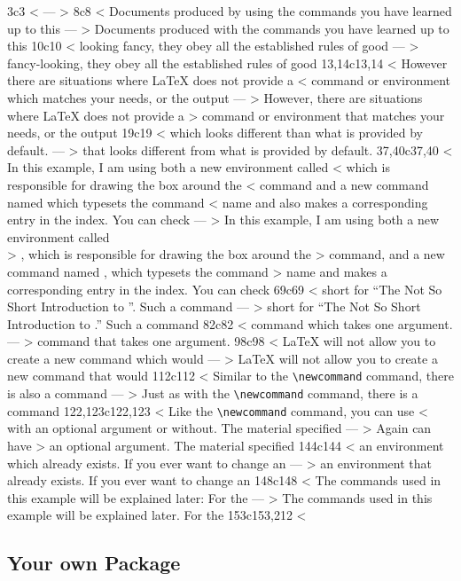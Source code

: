 3c3
< %
---
> %
8c8
< Documents produced by using the commands you have learned up to this
---
> Documents produced with the commands you have learned up to this
10c10
< looking fancy, they obey all the established rules of good
---
> fancy-looking, they obey all the established rules of good
13,14c13,14
< However there are situations where \LaTeX{} does not provide a
< command or environment which matches your needs, or the output
---
> However, there are situations where \LaTeX{} does not provide a
> command or environment that matches your needs, or the output
19c19
< which looks different than what is provided by default.
---
> that looks different from what is provided by default.
37,40c37,40
< In this example, I am using both a new environment called
<  which is responsible for drawing the box around the
< command and a new command named  which typesets the command
< name and also makes a corresponding entry in the index. You can check
---
> In this example, I am using both a new environment called\\
> , which is responsible for drawing the box around the
> command, and a new command named , which typesets the command
> name and makes a corresponding entry in the index. You can check
69c69
< short for ``The Not So Short Introduction to \LaTeXe''. Such a command
---
> short for ``The Not So Short Introduction to \LaTeXe.'' Such a command
82c82
< command which takes one argument.
---
> command that takes one argument.
98c98
< \LaTeX{} will not allow you to create a new command which would
---
> \LaTeX{} will not allow you to create a new command that would
112c112
< Similar to the \verb|\newcommand| command, there is also a command
---
> Just as with the \verb|\newcommand| command, there is a command
122,123c122,123
< Like the \verb|\newcommand| command, you can use 
< with an optional argument or without. The material specified
---
> Again  can have
> an optional argument. The material specified
144c144
< an environment which already exists. If you ever want to change an
---
> an environment that already exists. If you ever want to change an
148c148
< The commands used in this example will be explained later: For the
---
> The commands used in this example will be explained later. For the
153c153,212
< \subsection{Your own Package}

